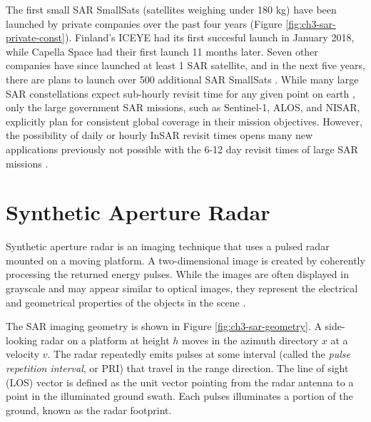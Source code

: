 The first small SAR SmallSats (satellites weighing under 180 kg) have been launched by private companies over the past four years (Figure \ref{fig:ch3-sar-private-const}). Finland's ICEYE had its first succesful launch in January 2018, while Capella Space had their first launch 11 months later. Seven other companies have since launched at least 1 SAR satellite, and in the next five years, there are plans to launch over 500 additional SAR SmallSats \citep{Kulu2021SatelliteConstellations2021}. While many large SAR constellations expect sub-hourly revisit time for any given point on earth \citep{Stringham2019CapellaXband}, only the large government SAR missions, such as Sentinel-1, ALOS, and NISAR, explicitly plan for consistent global coverage in their mission objectives. However, the possibility of daily or hourly InSAR revisit times opens many new applications previously not possible with the 6-12 day revisit times of large SAR missions \citep{YagueMartinez2021TowardsFrequentFlood, Taylor2021RemoteSensingMountain, Kitajima2021PotentialSarSmall}.






\section{Synthetic Aperture Radar}
\label{CHAP:3-sar}


Synthetic aperture radar is an imaging technique that uses a pulsed radar mounted on a moving platform. A two-dimensional image is created by coherently processing the returned energy pulses. While the images are often displayed in grayscale and may appear similar to optical images, they represent the electrical and geometrical properties of the objects in the scene \cite{Simons2007InterferometricSyntheticAperture}.


The SAR imaging geometry is shown in Figure \ref{fig:ch3-sar-geometry}. A side-looking radar on a platform at height $h$ moves in the azimuth directory $x$ at a velocity $v$.  The radar repeatedly emits pulses at some interval (called the \emph{pulse repetition interval}, or PRI) that travel in the range direction.
The line of sight (LOS) vector is defined as the unit vector pointing from the radar antenna to a point in the illuminated ground swath.
Each pulses illuminates a portion of the ground, known as the radar footprint.


